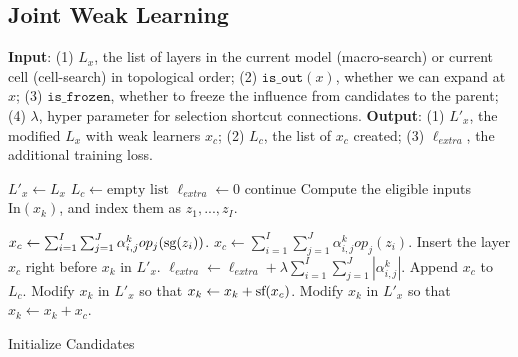 \subsection{Joint Weak Learning}
\label{sec:candidate_init_and_select}

\begin{algorithm}[t]
\begin{algorithmic}[1]
\STATE \textbf{Input}: 
(1) $L_x$, the list of layers in the current model (macro-search) or current cell (cell-search) in topological order;
(2) $\texttt{is\_out}(x)$, whether we can expand at $x$;
(3) $\texttt{is\_frozen}$, whether to freeze the influence from candidates to the parent;
(4) $\lambda$, hyper parameter for selection shortcut connections. 
\STATE \textbf{Output}: (1) $L'_x$, the modified $L_x$ with weak learners $x_c$; 
(2) $L_c$, the list of $x_c$ created;
(3) $\ell_{extra}$, the additional training loss.

\STATE $L'_x \leftarrow L_x$
\STATE $L_c \leftarrow \text{empty list}$
\STATE $\ell_{extra} \leftarrow 0$ 
        \STATE continue
    \ENDIF
    \STATE Compute the eligible inputs $\text{In}(x_{k})$, and index them as $z_1,...,z_I$.

        \STATE $x_c \leftarrow \sum _{i=1}^I \sum _{j=1}^J  \alpha^k_{i,j}op_j(\textrm{sg} (z_i))$.
        \label{algline:add_sg}
    \ELSE
        \STATE $x_c \leftarrow \sum _{i=1}^I \sum _{j=1}^J  \alpha^k_{i,j}op_j(z_i)$.
    \ENDIF
\STATE Insert the layer $x_c$ right before $x_{k}$ in $L'_x$.
\STATE $\ell_{extra} \leftarrow \ell_{extra} + \lambda \sum _{i=1}^I \sum _{j=1}^J |\alpha^k_{i,j}|$.
\STATE Append $x_c$ to $L_c$.
    \STATE Modify $x_{k}$ in $L'_x$ so that $x_{k} \leftarrow x_{k} + \textrm{sf} (x_c)$.
    \label{algline:add_sf}
\ELSE
    \STATE Modify $x_{k}$ in $L'_x$ so that $x_{k} \leftarrow x_{k} + x_c$.
\ENDIF
\ENDFOR
\end{algorithmic}
\caption{Initialize Candidates}
\label{alg:candidate_init}
\end{algorithm}

